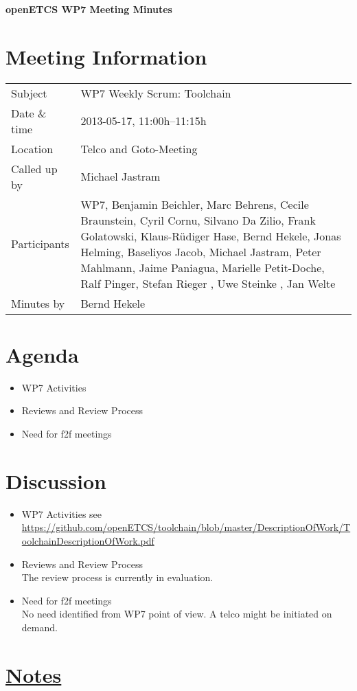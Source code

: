 \documentclass[a4paper, 11pt]{article}
\begin{document}
{\begin{center}\huge\bf openETCS WP7 Meeting Minutes\end{center}}
\section{Meeting Information}

\renewcommand{\arraystretch}{1.5}
\begin{supertabular}{m{.2\textwidth}m{.8\textwidth}}
Subject & WP7 Weekly Scrum: Toolchain\\
Date \& time & 2013-05-17, 11:00h--11:15h\\
Location & Telco and Goto-Meeting\\
Called up by & Michael Jastram\\
Participants & WP7,
Benjamin Beichler,
Marc Behrens,
Cecile Braunstein,
Cyril Cornu, 
Silvano Da Zilio,
Frank Golatowski, 
Klaus-R\"udiger Hase,
Bernd Hekele,
Jonas Helming,
Baseliyos Jacob,
Michael Jastram, 
Peter Mahlmann, 
Jaime Paniagua,
Marielle Petit-Doche, 
Ralf Pinger,
Stefan Rieger
, Uwe Steinke
, Jan Welte
\\

Minutes by & Bernd Hekele\\

\end{supertabular}
\renewcommand{\arraystretch}{1.0}


\section{Agenda}
\begin{itemize}
\item WP7 Activities
\item Reviews and Review Process
\item Need for f2f meetings	
\end{itemize}

\section{Discussion}

\begin{itemize}
\item WP7 Activities
see\\ \url{https://github.com/openETCS/toolchain/blob/master/DescriptionOfWork/ToolchainDescriptionOfWork.pdf}
\item Reviews and Review Process\\
The review process is currently in evaluation.
\item Need for f2f meetings\\
No need identified from WP7 point of view. A telco might be initiated on demand.

\end{itemize}

\section{\underline{Notes}}
\end{document}
